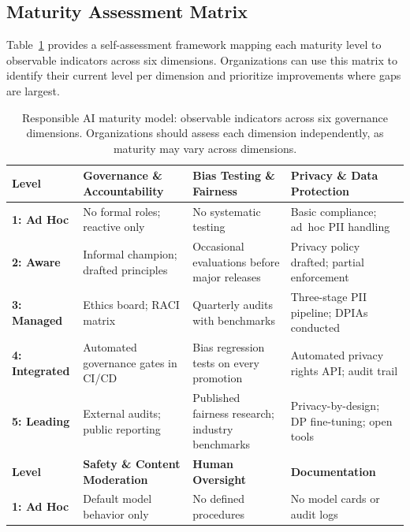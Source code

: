 \subsection{Maturity Assessment Matrix}\label{sec:ch11_maturity_matrix}

Table~\ref{tab:ch11_maturity_matrix} provides a self-assessment framework mapping each maturity level to observable indicators across six dimensions. Organizations can use this matrix to identify their current level per dimension and prioritize improvements where gaps are largest.

\begin{table}[t]
\centering
\small
\caption{Responsible AI maturity model: observable indicators across six governance dimensions. Organizations should assess each dimension independently, as maturity may vary across dimensions.}
\label{tab:ch11_maturity_matrix}
\setlength{\tabcolsep}{4pt}
\renewcommand{\arraystretch}{1.3}
\begin{tabularx}{\linewidth}{@{}>{\raggedright\arraybackslash}p{1.5cm}>{\raggedright\arraybackslash}X>{\raggedright\arraybackslash}X>{\raggedright\arraybackslash}X@{}}
\toprule
\rowcolor{gray!15}
\textbf{Level} & \textbf{Governance \& Accountability} & \textbf{Bias Testing \& Fairness} & \textbf{Privacy \& Data Protection} \\
\midrule
\textbf{1: Ad Hoc} & No formal roles; reactive only & No systematic testing & Basic compliance; ad~hoc PII handling \\
\addlinespace[2pt]
\textbf{2: Aware} & Informal champion; drafted principles & Occasional evaluations before major releases & Privacy policy drafted; partial enforcement \\
\addlinespace[2pt]
\textbf{3: Managed} & Ethics board; RACI matrix & Quarterly audits with benchmarks & Three-stage PII pipeline; DPIAs conducted \\
\addlinespace[2pt]
\textbf{4: Integrated} & Automated governance gates in CI/CD & Bias regression tests on every promotion & Automated privacy rights API; audit trail \\
\addlinespace[2pt]
\textbf{5: Leading} & External audits; public reporting & Published fairness research; industry benchmarks & Privacy-by-design; DP fine-tuning; open tools \\
\midrule
\rowcolor{gray!15}
\textbf{Level} & \textbf{Safety \& Content Moderation} & \textbf{Human Oversight} & \textbf{Documentation} \\
\midrule
\textbf{1: Ad Hoc} & Default model behavior only & No defined procedures & No model cards or audit logs \\

\end{tabularx}
\end{table}
